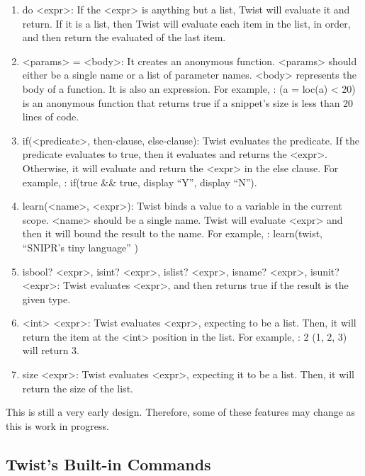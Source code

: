 \begin{enumerate}
	\item do <expr>: If the <expr> is anything but a list, Twist will evaluate it and 
	return. If it is a list, then Twist will evaluate each item in the list, in order, 
	and then return the evaluated of the last item.
	
	\item <params> = <body>: It creates an anonymous function. <params> should either be 
	a single name or a list of parameter names. <body> represents the body of a 
	function. It is also an expression. For example, : (a = loc(a) < 20) is an 
	anonymous function that returns true if a snippet's size is less than 20 lines of 
	code. 
	
	\item if(<predicate>, then-clause, else-clause): Twist evaluates the predicate. If 
	the predicate evaluates to true, then it evaluates and returns the <expr>. Otherwise, 
	it will evaluate and return the <expr> in the else clause. For example, : if(true 
	\&\& true, display ``Y'', display ``N'').
	
	\item learn(<name>, <expr>): Twist binds a value to a variable in the current scope. 
	<name> should be a single name. Twist will evaluate <expr> and then it will bound the 
	result to the name. For example, : learn(twist, ``SNIPR's tiny language'' )
   
	\item isbool? <expr>, isint? <expr>, islist? <expr>, isname? <expr>, isunit? <expr>: Twist 
	evaluates <expr>, and then returns true if the result is the given type.
 	
	\item <int> <expr>: Twist evaluates <expr>, expecting to be a list. Then, it will 
	return the item at the <int> position in the list. For example, : 2 (1, 2, 3) will 
	return 3.
	
	\item size <expr>: Twist evaluates <expr>, expecting it to be a list. Then, it will 
	return the size of the list.
\end{enumerate}

This is still a very early design. Therefore, some of these features may change as this 
is work in progress.

\subsection{Twist's Built-in Commands}
\label{sec:retargetingops}

